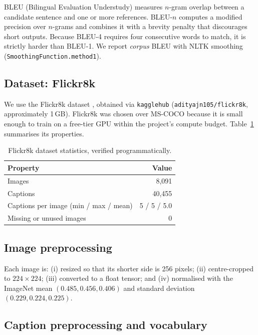 \documentclass{article}
\begin{document}
BLEU (Bilingual Evaluation Understudy) \citep{papineni2002bleu} measures
$n$-gram overlap between a candidate sentence and one or more references.
BLEU-$n$ computes a modified precision over $n$-grams and combines it with a
brevity penalty that discourages short outputs. Because BLEU-4 requires four
consecutive words to match, it is strictly harder than BLEU-1. We report
\emph{corpus} BLEU with NLTK smoothing (\texttt{SmoothingFunction.method1}).

\subsection{Dataset: Flickr8k}

We use the Flickr8k dataset \citep{hodosh2013framing}, obtained via \texttt{kagglehub} (\texttt{adityajn105/flickr8k}, approximately 1\,GB). Flickr8k was chosen over MS-COCO \citep{lin2014microsoft} because it is small enough to train on a free-tier GPU within the project's compute budget. Table~\ref{tab:dataset} summarises its properties.

\begin{table}[h]
  \caption{Flickr8k dataset statistics, verified programmatically.}
  \label{tab:dataset}
  \centering
  \begin{tabular}{lr}
    \toprule
    Property & Value \\
    \midrule
    Images & 8{,}091 \\
    Captions & 40{,}455 \\
    Captions per image (min / max / mean) & 5 / 5 / 5.0 \\
    Missing or unused images & 0 \\
    \bottomrule
  \end{tabular}
\end{table}

\subsection{Image preprocessing}

Each image is: (i) resized so that its shorter side is 256 pixels; (ii) centre-cropped to $224 \times 224$; (iii) converted to a float tensor; and (iv) normalised with the ImageNet mean $(0.485, 0.456, 0.406)$ and standard deviation
$(0.229, 0.224, 0.225)$.

\subsection{Caption preprocessing and vocabulary}
\end{document}
